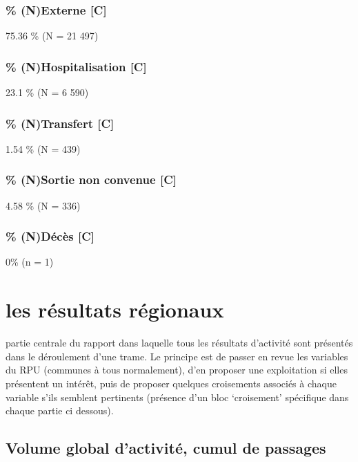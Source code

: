\documentclass[]{article}
\begin{document}
\subsubsection{\% (N)Externe {[}C{]}}\label{nexterne-c}

75.36 \% (N = 21 497)

\subsubsection{\% (N)Hospitalisation {[}C{]}}\label{nhospitalisation-c}

23.1 \% (N = 6 590)

\subsubsection{\% (N)Transfert {[}C{]}}\label{ntransfert-c}

1.54 \% (N = 439)

\subsubsection{\% (N)Sortie non convenue
{[}C{]}}\label{nsortie-non-convenue-c}

4.58 \% (N = 336)

\subsubsection{\% (N)Décès {[}C{]}}\label{ndeces-c}

0\% (n = 1)

\section{les résultats régionaux}\label{les-resultats-regionaux}

partie centrale du rapport dans laquelle tous les résultats d'activité
sont présentés dans le déroulement d'une trame. Le principe est de
passer en revue les variables du RPU (communes à tous normalement), d'en
proposer une exploitation si elles présentent un intérêt, puis de
proposer quelques croisements associés à chaque variable s'ils semblent
pertinents (présence d'un bloc `croisement' spécifique dans chaque
partie ci dessous).

\subsection{Volume global d'activité, cumul de
passages}\label{volume-global-dactivite-cumul-de-passages}
\end{document}
